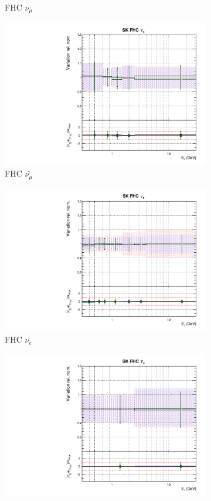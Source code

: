\begin{figure}[!htbp]
\begin{subfigure}{0.45\textwidth}
  \caption{\SK FHC $\nu_{\mu}$}
\end{subfigure}
\begin{subfigure}{0.45\textwidth}
  \centering
  \includegraphics[width=0.75\linewidth]{figs/polyasmvsflux_9}
  \caption{\SK FHC $\bar{\nu_{\mu}}$}
\end{subfigure}
\begin{subfigure}{0.45\textwidth}
  \centering
  \includegraphics[width=0.75\linewidth]{figs/polyasmvsflux_10}
  \caption{\SK FHC $\nu_{e}$}
\end{subfigure}
\begin{subfigure}{0.45\textwidth}
  \centering
  \includegraphics[width=0.75\linewidth]{figs/polyasmvsflux_11}

\end{subfigure}
\end{figure}
